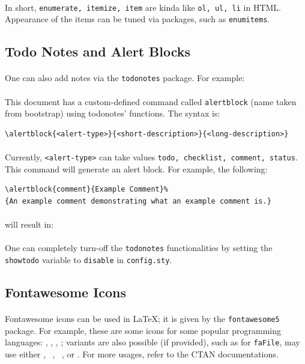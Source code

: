 \paragraph{}In short, \texttt{enumerate, itemize, item} are kinda like \texttt{ol, ul, li} in HTML. Appearance of the items can be tuned via packages, such as \texttt{enumitems}.

\subsection*{Todo Notes and Alert Blocks}
\paragraph{}One can also add notes via the \texttt{todonotes} package. For example: 
\paragraph{}This document has a custom-defined command called \texttt{alertblock} (name taken from bootstrap) using todonotes' functions. The syntax is:
\begin{verbatim}
\alertblock{<alert-type>}{<short-description>}{<long-description>}
\end{verbatim}
\paragraph{}Currently, \texttt{<alert-type>} can take values \texttt{todo, checklist, comment, status}. This command will generate an alert block. For example, the following:
\begin{verbatim}
\alertblock{comment}{Example Comment}%
{An example comment demonstrating what an example comment is.}
\end{verbatim}
\paragraph{}will result in:
\paragraph{}One can completely turn-off the \texttt{todonotes} functionalities by setting the \texttt{showtodo} variable to \texttt{disable} in \texttt{config.sty}.

\subsection*{Fontawesome Icons}
\paragraph{}Fontawesome icons can be used in \LaTeX; it is given by the \texttt{fontawesome5} package. For  example, these are some icons for some popular programming languages: \faPython, \faJava, \faJs, \faRust; variants are also possible (if provided), such as for \texttt{faFile}, may use either \faFile, \faFile*~, \faFile[regular]~, or \faFile*[regular]. For more usages, refer to the CTAN documentations.
